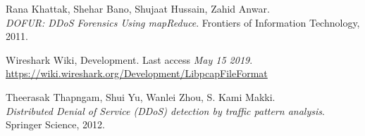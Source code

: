 \newpage
\begin{thebibliography}{9}
Rana Khattak, Shehar Bano, Shujaat Hussain, Zahid Anwar. 
\\\textit{DOFUR: DDoS Forensics Using mapReduce}. Frontiers of Information Technology, 2011.

Wireshark Wiki, Development. Last access \textit{May 15 2019}.
\\\url{https://wiki.wireshark.org/Development/LibpcapFileFormat}

Theerasak Thapngam, Shui Yu, Wanlei Zhou, S. Kami Makki.
\\\textit{Distributed Denial of Service (DDoS) detection by traffic pattern analysis}.
Springer Science, 2012.

\end{thebibliography}